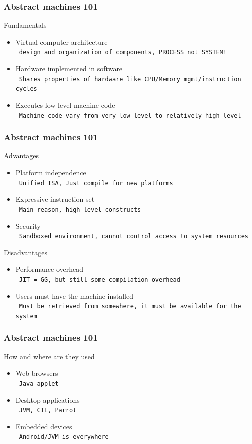 \documentclass{beamer}
\newcommand{\n}[1]{\leavevmode\\~\texttt{\color{red}\tiny #1}}
\begin{document}
\begin{frame}
  \frametitle{Abstract machines 101}

  Fundamentals

  \begin{itemize}[<+->]
  \item Virtual computer architecture
    \n{design and organization of components, PROCESS not SYSTEM!}
  \item Hardware implemented in software
    \n{Shares properties of hardware like CPU/Memory mgmt/instruction cycles}
  \item Executes low-level machine code
    \n{Machine code vary from very-low level to relatively high-level}
  \end{itemize}

\end{frame}

\begin{frame}
  \frametitle{Abstract machines 101}

  Advantages
  \begin{itemize}[<+->]
  \item Platform independence
    \n{Unified ISA, Just compile for new platforms}
  \item Expressive instruction set
    \n{Main reason, high-level constructs}
  \item Security
    \n{Sandboxed environment, cannot control access to system resources}
  \end{itemize}


  Disadvantages
  \begin{itemize}[<+->]
  \item Performance overhead
    \n{JIT = GG, but still some compilation overhead}
  \item Users must have the machine installed
    \n{Must be retrieved from somewhere, it must be available for the system}
  \end{itemize}

\end{frame}

\begin{frame}
  \frametitle{Abstract machines 101}

  How and where are they used
  \begin{itemize}[<+->]
  \item Web browsers
    \n{Java applet}
  \item Desktop applications
    \n{JVM, CIL, Parrot}
  \item Embedded devices
    \n{Android/JVM is everywhere}
  \end{itemize}

\end{frame}
\end{document}
